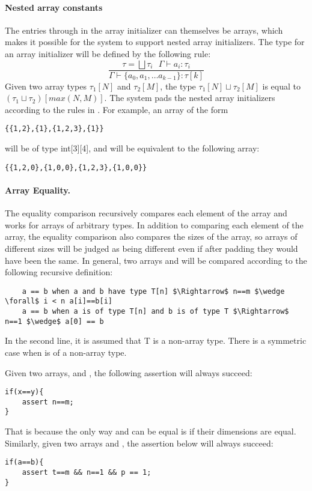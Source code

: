 \paragraph{Nested array constants}
The entries  through  in the array initializer can themselves be arrays, which makes it possible for the system to support nested array initializers. The type for an array initializer will be defined by the following rule:
\[
	\frac{\tau = \bigsqcup \tau_i~~~ \Gamma\vdash a_i:\tau_i }{\Gamma \vdash \{a_0, a_1, \ldots a_{k-1}\}:\tau[k]}
\]
Given two array types $\tau_1[N]$ and $\tau_2[M]$, the type $\tau_1[N] \sqcup \tau_2[M]$ is equal to $(\tau_1 \sqcup \tau_2)[max(N,M)]$. The system pads the nested array initializers according to the rules in . For example, an array of the form
\begin{lstlisting}
{{1,2},{1},{1,2,3},{1}}
\end{lstlisting}
will be of type int[3][4], and will be equivalent to the following array:
\begin{lstlisting}
{{1,2,0},{1,0,0},{1,2,3},{1,0,0}}
\end{lstlisting}


\paragraph{Array Equality.} The equality comparison recursively compares each element of the array and works for arrays of arbitrary types. In addition to comparing each element of the array, the equality comparison also compares the sizes of the array, so arrays of different sizes will be judged as being different even if after padding they would have been the same.
In general, two arrays  and  will be compared according to the following recursive definition:

\begin{lstlisting}
	a == b when a and b have type T[n] $\Rightarrow$ n==m $\wedge \forall$ i < n a[i]==b[i]
	a == b when a is of type T[n] and b is of type T $\Rightarrow$ n==1 $\wedge$ a[0] == b
\end{lstlisting}
In the second line, it is assumed that T is a non-array type. There is a symmetric case when  is of a non-array type.


\begin{Example}
Given two arrays,  and , the following assertion will always succeed:
\begin{lstlisting}
if(x==y){
	assert n==m;
}
\end{lstlisting}
That is because the only way  and  can be equal is if their dimensions are equal. Similarly, given two arrays  and , the assertion below will always succeed:
\begin{lstlisting}
if(a==b){
	assert t==m && n==1 && p == 1;
}
\end{lstlisting}
\end{Example}


